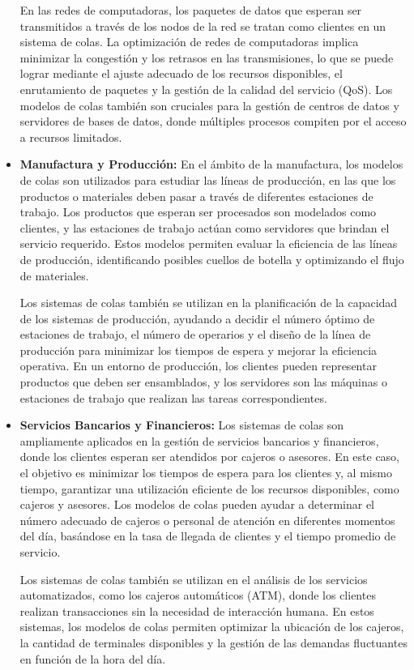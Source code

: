 \documentclass{article}
\begin{document}
\begin{itemize}
    En las redes de computadoras, los paquetes de datos que esperan ser transmitidos a través de los nodos de la red se tratan como clientes en un sistema de colas. La optimización de redes de computadoras implica minimizar la congestión y los retrasos en las transmisiones, lo que se puede lograr mediante el ajuste adecuado de los recursos disponibles, el enrutamiento de paquetes y la gestión de la calidad del servicio (QoS). Los modelos de colas también son cruciales para la gestión de centros de datos y servidores de bases de datos, donde múltiples procesos compiten por el acceso a recursos limitados.

    \item \textbf{Manufactura y Producción:}
    En el ámbito de la manufactura, los modelos de colas son utilizados para estudiar las líneas de producción, en las que los productos o materiales deben pasar a través de diferentes estaciones de trabajo. Los productos que esperan ser procesados son modelados como clientes, y las estaciones de trabajo actúan como servidores que brindan el servicio requerido. Estos modelos permiten evaluar la eficiencia de las líneas de producción, identificando posibles cuellos de botella y optimizando el flujo de materiales.

    Los sistemas de colas también se utilizan en la planificación de la capacidad de los sistemas de producción, ayudando a decidir el número óptimo de estaciones de trabajo, el número de operarios y el diseño de la línea de producción para minimizar los tiempos de espera y mejorar la eficiencia operativa. En un entorno de producción, los clientes pueden representar productos que deben ser ensamblados, y los servidores son las máquinas o estaciones de trabajo que realizan las tareas correspondientes.

    \item \textbf{Servicios Bancarios y Financieros:}
    Los sistemas de colas son ampliamente aplicados en la gestión de servicios bancarios y financieros, donde los clientes esperan ser atendidos por cajeros o asesores. En este caso, el objetivo es minimizar los tiempos de espera para los clientes y, al mismo tiempo, garantizar una utilización eficiente de los recursos disponibles, como cajeros y asesores. Los modelos de colas pueden ayudar a determinar el número adecuado de cajeros o personal de atención en diferentes momentos del día, basándose en la tasa de llegada de clientes y el tiempo promedio de servicio.

    Los sistemas de colas también se utilizan en el análisis de los servicios automatizados, como los cajeros automáticos (ATM), donde los clientes realizan transacciones sin la necesidad de interacción humana. En estos sistemas, los modelos de colas permiten optimizar la ubicación de los cajeros, la cantidad de terminales disponibles y la gestión de las demandas fluctuantes en función de la hora del día.


\end{itemize}
\end{document}

